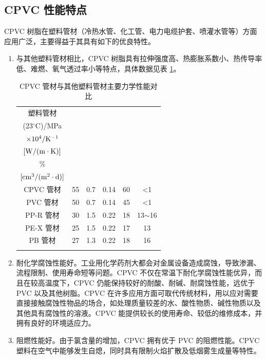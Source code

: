 \documentclass[a4paper, oneside, onecolumn, 12pt]{ctexrep}    %
\newcommand{\cd}{$^{\circ}$C}  %
\begin{document}
\subsection{CPVC 性能特点}
CPVC 树脂在塑料管材（冷热水管、化工管、电力电缆护套、喷灌水管等）方面应用广泛，主要得益于其具有如下的优良特性。

\begin{enumerate}[(1) ]
    \item 与其他塑料管材相比，CPVC 树脂具有拉伸强度高、热膨胀系数小、热传导率低、难燃、氧气透过率小等特点，具体数据见表 \ref{tab1}。
    
    \begin{table}[htbp]
        \caption{CPVC 管材与其他塑料管材主要力学性能对比\cite{9}}
        \label{tab1}
        \begin{center}
        \footnotesize{
            \begin{tabular}{cccccc}
                \Xhline{1pt}
                塑料管材 & \makecell[c]{拉伸强度 \\ (23\cd)/MPa} & \makecell[c]{热膨胀系数 \\ $\rm{\times 10^4/K^{-1}}$} & \makecell[c]{热传导率/ \\ $[\rm{W/(m\cdot K)}]$} & \makecell[c]{氧指数/ \\ \%} & \makecell[c]{氧气透过量(70\cd、1个大气压)/ \\ $[\rm{cm^3/(m^2\cdot d)}]$}  \\
                \Xhline{0.5pt}
                CPVC 管材 & 55 & 0.7 & 0.14 & 60 & <1 \\
                PVC 管材 & 50 & 0.7 & 0.14 & 45 & <1  \\
                PP-R 管材 & 30 & 1.5 & 0.22 & 18 & 13$\sim$16 \\
                PE-X 管材 & 25 & 1.5 & 0.22 & 17 & 13 \\
                PB 管材 & 27 & 1.3 & 0.22 & 18 & 16   \\
                \Xhline{1pt}
            \end{tabular}
        }
        \end{center}
    \end{table}
    
    \item 耐化学腐蚀性能好。工业用化学药剂大都会对金属设备造成腐蚀，导致渗漏、流程限制、使用寿命短等问题。CPVC 不仅在常温下耐化学腐蚀性能优异，而且在较高温度下，CPVC 仍能保持较好的耐酸、耐碱、耐腐蚀性能，远优于 PVC 以及其他树脂。CPVC 在许多应用方面可取代传统材料，用以应对需要直接接触腐蚀性物品的场合，如处理质量较差的水、酸性物质、碱性物质以及其他具有腐蚀性的溶液。CPVC 能提供较长的使用寿命、较低的维修成本，并拥有良好的环境适应力。
    \item 阻燃性能好。由于氯含量的增加，CPVC 拥有优于 PVC 的阻燃性能。CPVC 塑料在空气中能够发生自熄，同时具有限制火焰扩散及低烟雾生成量等特性。
\end{enumerate}
\end{document}
